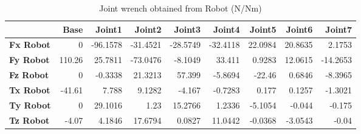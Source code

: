 \begin{table}[h!]
	\centering
	\caption{Joint wrench obtained from Robot (N/Nm)}
	\label{wrech_Robot_Pose8}
	\begin{tabular}{|l|r|r|r|r|r|r|r|r|}
		\hline
		\textbf{} & \textbf{Base} & \textbf{Joint1}  & \textbf{Joint2}  & \textbf{Joint3}  & \textbf{Joint4}  & \textbf{Joint5}  & \textbf{Joint6}  & \textbf{Joint7} \\ \hline
		\textbf{Fx Robot}  & 0        & -96.1578        & -31.4521        & -28.5749        & -32.4118        & 22.0984        & 20.8635        & 2.1753 \\ \hline
		\textbf{Fy Robot}  & 110.26        & 25.7811        & -73.0476        & -8.1049        & 33.411        & 0.9283        & 12.0615        & -14.2653 \\ \hline
		\textbf{Fz Robot}  & 0        & -0.3338        & 21.3213        & 57.399        & -5.8694        & -22.46        & 0.6846        & -8.3965 \\ \hline
		\textbf{Tx Robot}  & -41.61        & 7.788        & 9.1282        & -4.167        & -0.7283        & 0.177        & 0.1257        & -1.3021 \\ \hline
		\textbf{Ty Robot}  & 0        & 29.1016        & 1.23        & 15.2766        & 1.2336        & -5.1054        & -0.044        & -0.175 \\ \hline
		\textbf{Tz Robot}  & -4.07        & 4.1846        & 17.6794        & 0.0827        & 11.0442        & -0.0368        & -3.0543        & -0.04 \\ \hline
	\end{tabular}
\end{table}


